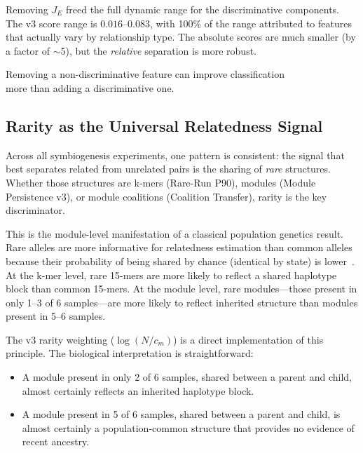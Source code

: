 \documentclass{../yalumba}
\begin{document}
Removing $J_E$ freed the full dynamic range for the discriminative components.
The v3 score range is $0.016$--$0.083$, with 100\% of the range attributed to
features that actually vary by relationship type.  The absolute scores are
much smaller (by a factor of $\sim$5), but the \emph{relative} separation is
more robust.

\begin{pullquote}
Removing a non-discriminative feature can improve classification\\
more than adding a discriminative one.
\end{pullquote}

\subsection{Rarity as the Universal Relatedness Signal}

Across all symbiogenesis experiments, one pattern is consistent: the signal
that best separates related from unrelated pairs is the sharing of
\emph{rare} structures.  Whether those structures are k-mers (Rare-Run P90),
modules (Module Persistence v3), or module coalitions (Coalition Transfer),
rarity is the key discriminator.

This is the module-level manifestation of a classical population genetics
result.  Rare alleles are more informative for relatedness estimation than
common alleles because their probability of being shared by chance (identical
by state) is lower~\cite{browning2012ibd}.  At the k-mer level, rare 15-mers
are more likely to reflect a shared haplotype block than common 15-mers.  At
the module level, rare modules---those present in only 1--3 of 6 samples---are
more likely to reflect inherited structure than modules present in 5--6
samples.

The v3 rarity weighting ($\log(N/c_m)$) is a direct implementation of this
principle.  The biological interpretation is straightforward:

\begin{itemize}
  \item A module present in only 2 of 6 samples, shared between a parent and
        child, almost certainly reflects an inherited haplotype block.
  \item A module present in 5 of 6 samples, shared between a parent and child,
        is almost certainly a population-common structure that provides no
        evidence of recent ancestry.
\end{itemize}
\end{document}
